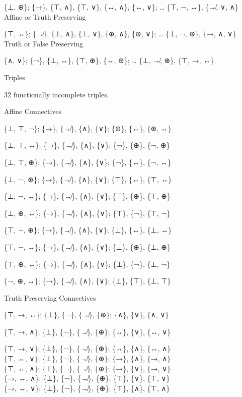 \{⊥, ⊕\}; \{→\}, \{⊤, ∧\}, \{⊤, ∨\}, \{↔, ∧\}, \{↔, ∨\}; \ldots{} \{⊤,
¬, ↔\}, \{↛, ∨, ∧\}\\
Affine or Truth Preserving

\{⊤, ↔\}; \{↛\}, \{⊥, ∧\}, \{⊥, ∨\}, \{⊕, ∧\}, \{⊕, ∨\}; \ldots{} \{⊥,
¬, ⊕\}, \{→, ∧, ∨\}\\
Truth or False Preserving

\{∧, ∨\}; \{¬\}, \{⊥, ↔\}, \{⊤, ⊕\}, \{↔, ⊕\}; \ldots{} \{⊥, ↛, ⊕\},
\{⊤, →, ↔\}

\protect\hypertarget{anchor-14}{}{}Triples

32 functionally incomplete triples.

\protect\hypertarget{anchor-15}{}{}Affine Connectives

\{⊥, ⊤, ¬\}; \{→\}, \{↛\}, \{∧\}, \{∨\}; \{⊕\}, \{↔\}, \{⊕, ↔\}

\{⊥, ⊤, ↔\}; \{→\}, \{↛\}, \{∧\}, \{∨\}; \{¬\}, \{⊕\}, \{¬, ⊕\}

\{⊥, ⊤, ⊕\}; \{→\}, \{↛\}, \{∧\}, \{∨\}; \{¬\}, \{↔\}, \{¬, ↔\}

\{⊥, ¬, ⊕\}; \{→\}, \{↛\}, \{∧\}, \{∨\}; \{⊤\}, \{↔\}, \{⊤, ↔\}

\{⊥, ¬, ↔\}; \{→\}, \{↛\}, \{∧\}, \{∨\}; \{⊤\}, \{⊕\}, \{⊤, ⊕\}

\{⊥, ⊕, ↔\}; \{→\}, \{↛\}, \{∧\}, \{∨\}; \{⊤\}, \{¬\}, \{⊤, ¬\}

\{⊤, ¬, ⊕\}; \{→\}, \{↛\}, \{∧\}, \{∨\}; \{⊥\}, \{↔\}, \{⊥, ↔\}

\{⊤, ¬, ↔\}; \{→\}, \{↛\}, \{∧\}, \{∨\}; \{⊥\}, \{⊕\}, \{⊥, ⊕\}

\{⊤, ⊕, ↔\}; \{→\}, \{↛\}, \{∧\}, \{∨\}; \{⊥\}, \{¬\}, \{⊥, ¬\}

\{¬, ⊕, ↔\}; \{→\}, \{↛\}, \{∧\}, \{∨\}; \{⊥\}, \{⊤\}, \{⊥, ⊤\}

\protect\hypertarget{anchor-16}{}{}Truth Preserving Connectives

\{⊤, →, ↔\}; \{⊥\}, \{¬\}, \{↛\}, \{⊕\}; \{∧\}, \{∨\}, \{∧, ∨\}

\{⊤, →, ∧\}; \{⊥\}, \{¬\}, \{↛\}, \{⊕\}; \{↔\}, \{∨\}, \{↔, ∨\}

\{⊤, →, ∨\}; \{⊥\}, \{¬\}, \{↛\}, \{⊕\}; \{↔\}, \{∧\}, \{↔, ∧\}\\
\{⊤, ↔, ∨\}; \{⊥\}, \{¬\}, \{↛\}, \{⊕\}; \{→\}, \{∧\}, \{→, ∧\}\\
\{⊤, ↔, ∧\}; \{⊥\}, \{¬\}, \{↛\}, \{⊕\}; \{→\}, \{∨\}, \{→, ∨\}\\
\{→, ↔, ∧\}; \{⊥\}, \{¬\}, \{↛\}, \{⊕\}; \{⊤\}, \{∨\}, \{⊤, ∨\}\\
\{→, ↔, ∨\}; \{⊥\}, \{¬\}, \{↛\}, \{⊕\}; \{⊤\}, \{∧\}, \{⊤, ∧\}


